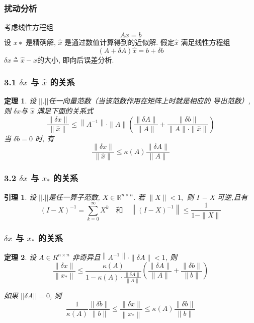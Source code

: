 \documentclass[notheorems,serif]{beamer}
\newcommand{\hei}[1]{{\HEI#1}}
\newtheorem{theorem}{\hei{定理}}
\newtheorem{lemma}{\hei{引理}}
\begin{document}
\begin{frame}
\frametitle{扰动分析}
考虑线性方程组
\begin{equation}
A x=b
\end{equation}
设 $x∗$ 是精确解, $\hat{x}$ 是通过数值计算得到的近似解. 假定$ \hat{x}$ 满足线性方程组
\begin{equation}
(A+\delta A) \hat{x}=b+\delta b
\end{equation}
$\delta x \triangleq \hat{x}-x$的大小, 即向后误差分析.

\end{frame}

\begin{frame}
\frametitle{3.1 \quad $δx$ 与 $\hat{x}$ 的关系}
\begin{theorem}
	设 $||.||$任一向量范数（当该范数作用在矩阵上时就是相应的
	导出范数）, 则 $δx $与 $\hat{x}$ 满足下面的关系式
	\begin{equation}
	\frac{\|\delta x\|}{\|\hat{x}\|} \leq\left\|A^{-1}\right\| \cdot\|A\|\left(\frac{\|\delta A\|}{\|A\|}+\frac{\|\delta b\|}{\|A\| \cdot\|\hat{x}\|}\right)
	\end{equation}
	当 $δb = 0$ 时, 有
	\begin{equation}
	\frac{\|\delta x\|}{\|\hat{x}\|} \leq \kappa(A) \frac{\|\delta A\|}{\|A\|}
	\end{equation}
\end{theorem}
\end{frame}

\begin{frame}
\frametitle{3.2 \quad $δx$ 与 $x_{*}$ 的关系}
\begin{lemma}
	设 $||.||$是任一算子范数, $X ∈\mathbb{R}^{n×n}$. 若 $∥X∥ < 1,$ 则 I − X 可逆,且有
	\begin{equation}
	(I-X)^{-1}=\sum_{k=0}^{\infty} X^{k} \quad \text{和} \quad\left\|(I-X)^{-1}\right\| \leq \frac{1}{1-\|X\|}
	\end{equation}
\end{lemma}
\end{frame}

\begin{frame}
\frametitle{$δx$ 与 $x_{*}$ 的关系}
\begin{theorem}
	设 $A ∈ R^{n×n}$ 非奇异且$\left\|A^{-1}\right\| \cdot\|\delta A\|<1$, 则
	\begin{equation}
	\frac{\|\delta x\|}{\left\|x_{*}\right\|} \leq \frac{\kappa(A)}{1-\kappa(A) \cdot \frac{\|\delta A\|}{\|A\|}}\left(\frac{\|\delta A\|}{\|A\|}+\frac{\|\delta b\|}{\|b\|}\right)
	\end{equation}
	
	如果 $||\delta A||=0$, 则
	\begin{equation}
	\frac{1}{\kappa(A)} \frac{\|\delta b\|}{\|b\|} \leq \frac{\|\delta x\|}{\left\|x_{*}\right\|} \leq \kappa(A) \frac{\|\delta b\|}{\|b\|}
	\end{equation}
\end{theorem}
\end{frame}
\end{document}
